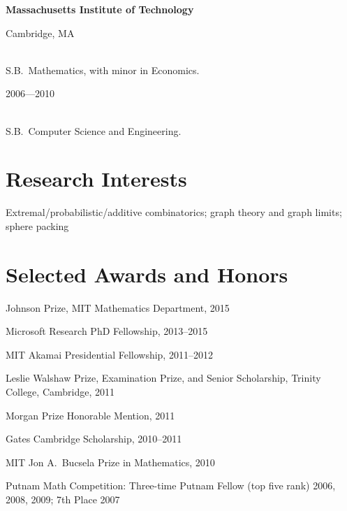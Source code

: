 \documentclass[11pt]{amsart}
\newcommand{\blankline}{\quad\vspace{-6pt}\pagebreak[2]}
\newcommand{\rightloc}[1]{\hfill {\raggedright #1}}
\newcommand{\rightdate}[1]{\hfill {\raggedright #1}}
\newcommand{\p}[1]{{\bfseries #1}}
\newcommand{\q}{\null\quad}
\begin{document}
\p{Massachusetts Institute of Technology} \rightloc{Cambridge, MA} \\
\q S.B.~Mathematics, with minor in Economics. \rightdate{2006---2010} \\
\q S.B.~Computer Science and Engineering. %

\section*{Research Interests}

Extremal/probabilistic/additive combinatorics;
graph theory and graph limits;
sphere packing

\section*{Selected Awards and Honors}

Johnson Prize, MIT Mathematics Department, 2015


Microsoft Research PhD Fellowship, 2013--2015

MIT Akamai Presidential Fellowship, 2011--2012

Leslie Walshaw Prize, Examination Prize, and Senior Scholarship,
Trinity College, Cambridge, 2011


Morgan Prize Honorable Mention, 2011


Gates Cambridge Scholarship, 2010--2011





MIT Jon A.~Bucsela Prize in Mathematics, 2010



Putnam Math Competition: Three-time Putnam Fellow (top five rank) 2006, 2008, 2009; 7th Place 2007
\end{document}
